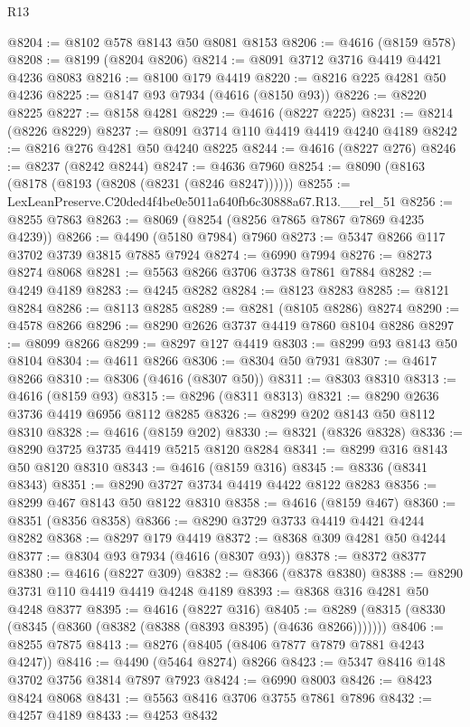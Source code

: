 \begin{lexlean}{R13}
\begin{coremodule}
@8204 := @8102 @578 @8143 @50 @8081 @8153
@8206 := @4616 (@8159 @578)
@8208 := @8199 (@8204 @8206)
@8214 := @8091 @3712 @3716 @4419 @4421 @4236 @8083
@8216 := @8100 @179 @4419
@8220 := @8216 @225 @4281 @50 @4236
@8225 := @8147 @93 @7934 (@4616 (@8150 @93))
@8226 := @8220 @8225
@8227 := @8158 @4281
@8229 := @4616 (@8227 @225)
@8231 := @8214 (@8226 @8229)
@8237 := @8091 @3714 @110 @4419 @4419 @4240 @4189
@8242 := @8216 @276 @4281 @50 @4240 @8225
@8244 := @4616 (@8227 @276)
@8246 := @8237 (@8242 @8244)
@8247 := @4636 @7960
@8254 := @8090 (@8163 (@8178 (@8193 (@8208 (@8231 (@8246 @8247))))))
@8255 := LexLeanPreserve.C20ded4f4be0e5011a640fb6c30888a67.R13.__rel_51
@8256 := @8255 @7863
@8263 := @8069 (@8254 (@8256 @7865 @7867 @7869 @4235 @4239))
@8266 := @4490 (@5180 @7984) @7960
@8273 := @5347 @8266 @117 @3702 @3739 @3815 @7885 @7924
@8274 := @6990 @7994
@8276 := @8273 @8274 @8068
@8281 := @5563 @8266 @3706 @3738 @7861 @7884
@8282 := @4249 @4189
@8283 := @4245 @8282
@8284 := @8123 @8283
@8285 := @8121 @8284
@8286 := @8113 @8285
@8289 := @8281 (@8105 @8286) @8274
@8290 := @4578 @8266
@8296 := @8290 @2626 @3737 @4419 @7860 @8104 @8286
@8297 := @8099 @8266
@8299 := @8297 @127 @4419
@8303 := @8299 @93 @8143 @50 @8104
@8304 := @4611 @8266
@8306 := @8304 @50 @7931
@8307 := @4617 @8266
@8310 := @8306 (@4616 (@8307 @50))
@8311 := @8303 @8310
@8313 := @4616 (@8159 @93)
@8315 := @8296 (@8311 @8313)
@8321 := @8290 @2636 @3736 @4419 @6956 @8112 @8285
@8326 := @8299 @202 @8143 @50 @8112 @8310
@8328 := @4616 (@8159 @202)
@8330 := @8321 (@8326 @8328)
@8336 := @8290 @3725 @3735 @4419 @5215 @8120 @8284
@8341 := @8299 @316 @8143 @50 @8120 @8310
@8343 := @4616 (@8159 @316)
@8345 := @8336 (@8341 @8343)
@8351 := @8290 @3727 @3734 @4419 @4422 @8122 @8283
@8356 := @8299 @467 @8143 @50 @8122 @8310
@8358 := @4616 (@8159 @467)
@8360 := @8351 (@8356 @8358)
@8366 := @8290 @3729 @3733 @4419 @4421 @4244 @8282
@8368 := @8297 @179 @4419
@8372 := @8368 @309 @4281 @50 @4244
@8377 := @8304 @93 @7934 (@4616 (@8307 @93))
@8378 := @8372 @8377
@8380 := @4616 (@8227 @309)
@8382 := @8366 (@8378 @8380)
@8388 := @8290 @3731 @110 @4419 @4419 @4248 @4189
@8393 := @8368 @316 @4281 @50 @4248 @8377
@8395 := @4616 (@8227 @316)
@8405 := @8289 (@8315 (@8330 (@8345 (@8360 (@8382 (@8388 (@8393 @8395) (@4636 @8266)))))))
@8406 := @8255 @7875
@8413 := @8276 (@8405 (@8406 @7877 @7879 @7881 @4243 @4247))
@8416 := @4490 (@5464 @8274) @8266
@8423 := @5347 @8416 @148 @3702 @3756 @3814 @7897 @7923
@8424 := @6990 @8003
@8426 := @8423 @8424 @8068
@8431 := @5563 @8416 @3706 @3755 @7861 @7896
@8432 := @4257 @4189
@8433 := @4253 @8432

\end{coremodule}
\end{lexlean}
